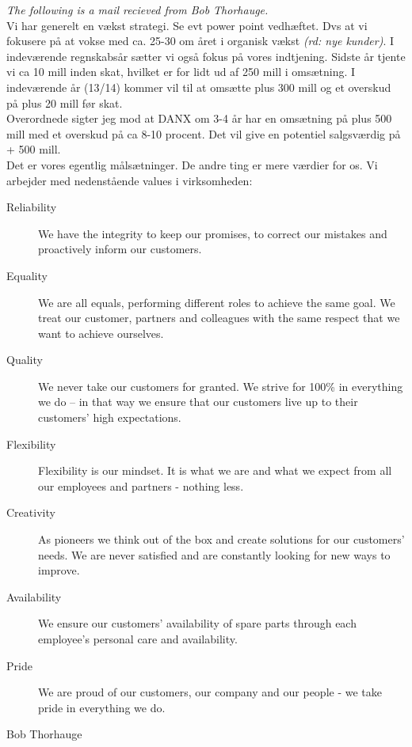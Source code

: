 \begin{thebibliography}{9}
	\textit{The following is a mail recieved from Bob Thorhauge.}\\
	Vi har generelt en vækst strategi. Se evt power point vedhæftet. Dvs at vi fokusere på at vokse med ca. 25-30 om året i organisk vækst \emph{(rd: nye kunder)}. I indeværende regnskabsår sætter vi også fokus på vores indtjening. Sidste år tjente vi ca 10 mill inden skat, hvilket er for lidt ud af 250 mill i omsætning. I indeværende år (13/14) kommer vil til at omsætte plus 300 mill og et overskud på plus 20 mill før skat.\\
	Overordnede sigter jeg mod at DANX om 3-4 år har en omsætning på plus 500 mill med et overskud på ca 8-10 procent. Det vil give en potentiel salgsværdig på + 500 mill.\\
	Det er vores egentlig målsætninger. De andre ting er mere værdier for os. Vi arbejder med nedenstående values i virksomheden:
\begin{description}
\item[Reliability]
We have the integrity to keep our promises, to correct our mistakes and proactively inform our customers.
\item[Equality]
We are all equals, performing different roles to achieve the same goal.
We treat our customer, partners and colleagues with the same respect that we want to achieve ourselves.
\item[Quality]
We never take our customers for granted.
We strive for 100\% in everything we do – in that way we ensure that our customers live up to their customers’ high expectations.
\item[Flexibility]
Flexibility is our mindset. It is what we are and what we expect from all our employees and partners - nothing less.
\item[Creativity]
As pioneers we think out of the box and create solutions for our customers’ needs.
We are never satisfied and are constantly looking for new ways to improve.
\item[Availability]
We ensure our customers’ availability of spare parts through each employee’s personal care and availability.
\item[Pride]
We are proud of our customers, our company and our people - we take pride in everything we do.
\end{description}
Bob Thorhauge


\end{thebibliography}
